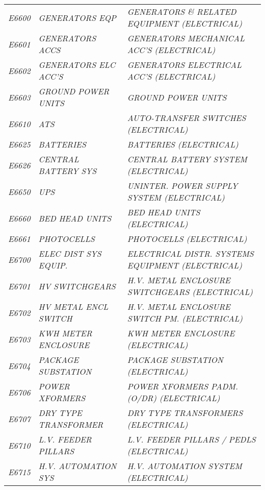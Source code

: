 \begin{landscape}
\begin{longtable}[l]{l%
                  l|%
                  l|}
\itshape E6600       &\itshape GENERATORS EQP   &\itshape GENERATORS \& RELATED EQUIPMENT (ELECTRICAL)   \\
\itshape E6601       &\itshape GENERATORS ACCS   &\itshape GENERATORS MECHANICAL ACC'S (ELECTRICAL)   \\
\itshape E6602       &\itshape GENERATORS ELC ACC'S   &\itshape GENERATORS ELECTRICAL ACC'S (ELECTRICAL)   \\
\itshape E6603       &\itshape GROUND POWER UNITS   &\itshape GROUND POWER UNITS   \\
\itshape E6610       &\itshape ATS   &\itshape AUTO-TRANSFER SWITCHES (ELECTRICAL)   \\
\itshape E6625       &\itshape BATTERIES   &\itshape BATTERIES (ELECTRICAL)   \\
\itshape E6626       &\itshape CENTRAL BATTERY SYS   &\itshape CENTRAL BATTERY SYSTEM (ELECTRICAL)   \\
\itshape E6650       &\itshape UPS   &\itshape UNINTER. POWER SUPPLY SYSTEM (ELECTRICAL)   \\
\itshape E6660       &\itshape BED HEAD UNITS   &\itshape BED HEAD UNITS (ELECTRICAL)   \\
\itshape E6661       &\itshape PHOTOCELLS   &\itshape PHOTOCELLS (ELECTRICAL)   \\
\itshape E6700       &\itshape ELEC DIST SYS EQUIP.   &\itshape ELECTRICAL DISTR. SYSTEMS EQUIPMENT (ELECTRICAL)   \\
\itshape E6701       &\itshape HV SWITCHGEARS   &\itshape H.V. METAL ENCLOSURE SWITCHGEARS (ELECTRICAL)   \\
\itshape E6702       &\itshape HV METAL ENCL SWITCH   &\itshape H.V. METAL ENCLOSURE SWITCH PM. (ELECTRICAL)   \\
\itshape E6703       &\itshape KWH METER ENCLOSURE   &\itshape KWH METER ENCLOSURE (ELECTRICAL)   \\
\itshape E6704       &\itshape PACKAGE SUBSTATION   &\itshape PACKAGE SUBSTATION (ELECTRICAL)   \\
\itshape E6706       &\itshape POWER XFORMERS   &\itshape POWER XFORMERS PADM. (O/DR) (ELECTRICAL)   \\
\itshape E6707       &\itshape DRY TYPE TRANSFORMER   &\itshape DRY TYPE TRANSFORMERS (ELECTRICAL)   \\
\itshape E6710       &\itshape L.V. FEEDER PILLARS   &\itshape L.V. FEEDER PILLARS / PEDLS (ELECTRICAL)   \\
\itshape E6715       &\itshape H.V. AUTOMATION SYS   &\itshape H.V. AUTOMATION SYSTEM (ELECTRICAL)   \\

\end{longtable}
\end{landscape}
